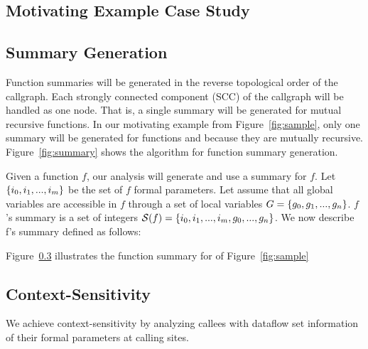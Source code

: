 \subsection{Motivating Example Case Study}\label{sec:sampleSummary}

\subsection{Summary Generation}\label{sec:summaries}

Function summaries will be generated in the reverse
topological order of the callgraph. Each strongly connected
component (SCC) of the callgraph will be handled as one
node. That is, a single summary will be generated for
mutual recursive functions. In our motivating example
from Figure~\ref{fig:sample}, only one summary will
be generated for functions \even{} and \odd{} because they
are mutually recursive.
Figure~\ref{fig:summary} shows the algorithm for function
summary generation.

Given a function $f$, our analysis will generate and use
a summary for $f$. Let $\{i_0, i_1, ..., i_m\}$ be the set
of $f$ formal parameters. Let assume that all global variables
are accessible in $f$ through a set of local variables 
$G = \{g_0, g_1, ..., g_n\}$. $f$'s summary is a set of integers 
$\mathcal{S}(f) = \{i_0, i_1, ...,i_m, g_0, ...,g_n\}$.
We now describe f's summary 
defined as follows: 

Figure~\ref{} illustrates the function summary for \main{}
of Figure~\ref{fig:sample}

\subsection{Context-Sensitivity} 

We achieve context-sensitivity by analyzing callees
with dataflow set information of their formal parameters
at calling sites.
